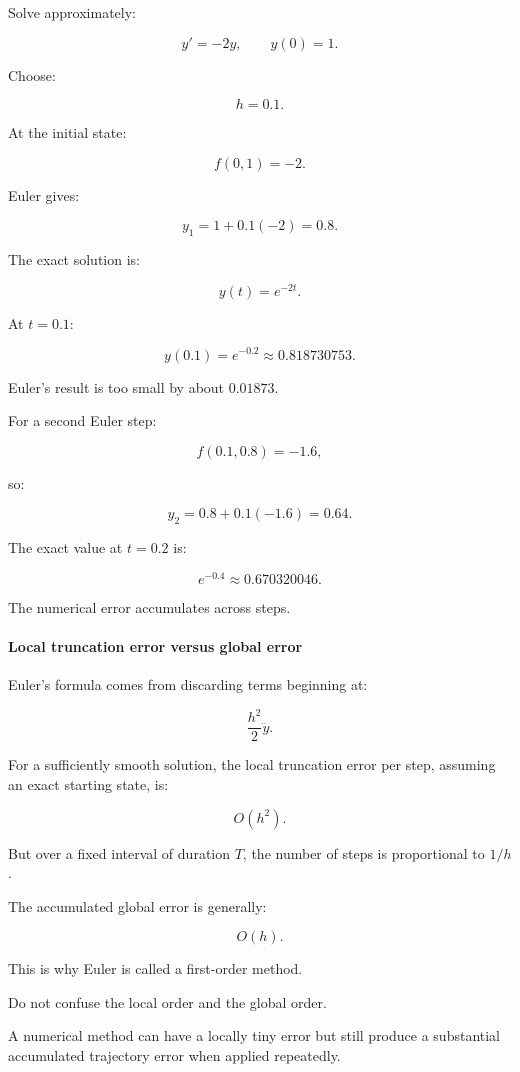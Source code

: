 Solve approximately:

\[
y'=-2y,\qquad y(0)=1.
\]

Choose:

\[
h=0.1.
\]

At the initial state:

\[
f(0,1)=-2.
\]

Euler gives:

\[
y_1=1+0.1(-2)=\boxed{0.8}.
\]

The exact solution is:

\[
y(t)=e^{-2t}.
\]

At \(t=0.1\):

\[
y(0.1)=e^{-0.2}\approx0.818730753.
\]

Euler's result is too small by about \(0.01873\).

For a second Euler step:

\[
f(0.1,0.8)=-1.6,
\]

so:

\[
y_2=0.8+0.1(-1.6)=0.64.
\]

The exact value at \(t=0.2\) is:

\[
e^{-0.4}\approx0.670320046.
\]

The numerical error accumulates across steps.

\paragraph{Local truncation error versus global error}\label{02-foundations-ii-ch025-local-truncation-error-versus-global-error}

Euler's formula comes from discarding terms beginning at:

\[
\frac{h^2}{2}\ddot y.
\]

For a sufficiently smooth solution, the local truncation error per step, assuming an exact starting state, is:

\[
O(h^2).
\]

But over a fixed interval of duration \(T\), the number of steps is proportional to \(1/h\).

The accumulated global error is generally:

\[
\boxed{O(h)}.
\]

This is why Euler is called a first-order method.

Do not confuse the local order and the global order.

A numerical method can have a locally tiny error but still produce a substantial accumulated trajectory error when applied repeatedly.

